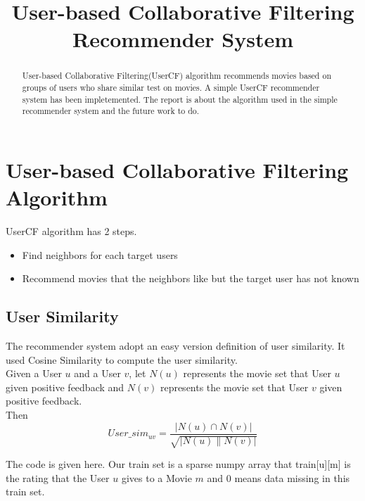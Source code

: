 \documentclass[]{article}
\title{User-based Collaborative Filtering Recommender System}
\author{}
\begin{document}
\maketitle

\begin{abstract}
User-based Collaborative Filtering(UserCF) algorithm recommends movies based on groups of users who share similar test on movies.
A simple UserCF recommender system has been impletemented. The report is about the algorithm used in the simple recommender system and the future work to do.
\end{abstract}
\section{User-based Collaborative Filtering Algorithm}
UserCF algorithm has 2 steps.

\begin{itemize}
  \item Find neighbors for each target users
  \item Recommend movies that the neighbors like but the target user has not known 
\end{itemize}

\subsection{User Similarity}
The recommender system adopt an easy version definition of user similarity. It used Cosine Similarity to compute the user similarity.\\

Given a User $u$ and a User $v$, let $N(u)$ represents the movie set that User $u$ given positive feedback and $N(v)$ represents the movie set that User $v$ given positive feedback. \\

Then
\begin{equation}
User\_sim_{uv} = \frac{|N(u) \cap N(v)|}{ \sqrt{ |N(u) \parallel N(v)|} }
\end{equation}

The code is given here. Our train set is a sparse numpy array that train[u][m] is the rating that the User $u$ gives to a Movie $m$ and 0 means data missing in this train set.
\end{document}
